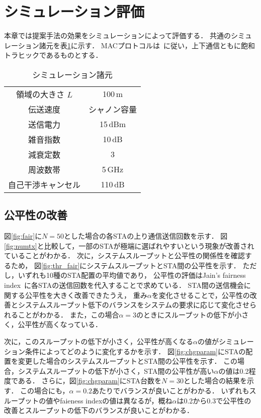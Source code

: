 \documentclass[technicalreport]{ieicej}
\begin{document}
\section{シミュレーション評価}
	本章では提案手法の効果をシミュレーションによって評価する．
	共通のシミュレーション諸元を表\ref{tab:param}に示す．
	MACプロトコルは~\cite{promac}に従い，上下通信ともに飽和トラヒックであるものとする．

	\begin{table}[t]
		\centering
		\caption{シミュレーション諸元}
		\label{tab:param}
		\begin{tabular}{cc} \hline
			領域の大きさ $L$ & 100\,m \\
			伝送速度 & シャノン容量 \\
			送信電力 & 15\,dBm \\
			雑音指数 & 10\,dB \\
			減衰定数 & 3 \\
			周波数帯 & 5\,GHz \\
			自己干渉キャンセル & 110\,dB \\ \hline
		\end{tabular}
	\end{table}

	\subsection{公平性の改善}
	図\ref{fig:fair}に$N=50$とした場合の各STAの上り通信送信回数を示す．
	図\ref{fig:numtx}と比較して，一部のSTAが極端に選ばれやすいという現象が改善されていることがわかる．
	次に，システムスループットと公平性の関係性を確認するため，
	図\ref{fig:thr_fair}にシステムスループットとSTA間の公平性を示す．
	ただし，いずれも10種のSTA配置の平均値であり，
	公平性の評価はJain's fairness index~\cite{jain}に各STAの送信回数を代入することで求めている．
	STA間の送信機会に関する公平性を大きく改善できたうえ，
	重み$\alpha$を変化させることで，公平性の改善とシステムスループット低下のバランスをシステムの要求に応じて変化させられることがわかる．
	また，この場合$\alpha=3$のときにスループットの低下が小さく，公平性が高くなっている．
	\par
	次に，このスループットの低下が小さく，公平性が高くなる$\alpha$の値がシミュレーション条件によってどのように変化するかを示す．
	図\ref{fig:chgparam}にSTAの配置を変更した場合のシステムスループットとSTA間の公平性を示す．
	この場合，システムスループットの低下が小さく，STA間の公平性が高い$\alpha$の値は0.2程度である．
	さらに，図\ref{fig:chgparam}にSTA台数を$N=30$とした場合の結果を示す．
	この場合にも，$\alpha=0.2$あたりでバランスが良いことがわかる．
	いずれもスループットの値やfaieness indexの値は異なるが，概ね$\alpha$は0.2から0.3で公平性の改善とスループットの低下のバランスが良いことがわかる．
\end{document}
